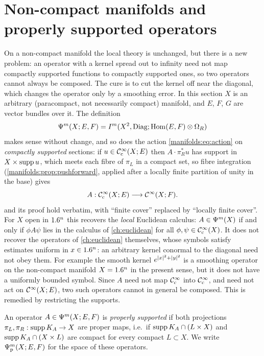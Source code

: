 \section{Non-compact manifolds and properly supported operators}\label{manifolds:sec:noncompact}
On a non-compact manifold the local theory is unchanged, but there is a new
problem: an operator with a kernel spread out to infinity need not map
compactly supported functions to compactly supported ones, so two operators
cannot always be composed. The cure is to cut the kernel off near the
diagonal, which changes the operator only by a smoothing error.
In this section $X$ is an arbitrary (paracompact, not necessarily compact)
manifold, and $E$, $F$, $G$ are vector bundles over it. The definition
\begin{equation*}
\Psi^{m}(X;E,F)=I^{m}(X^2,\operatorname{Diag};\operatorname{Hom}(E,F)\otimes\Omega_R)
\end{equation*}
makes sense without change, and so does the action
\eqref{manifolds:eq:action} on \emph{compactly supported} sections: if
$u\in\mathcal{C}^\infty_{\mathrm{c}}(X;E)$ then $A\cdot\pi_R^*u$ has support in $X\times\operatorname{supp} u$, which meets
each fibre of $\pi_L$ in a compact set, so fibre integration
(\cref{manifolds:prop:pushforward}, applied after a locally finite partition of
unity in the base) gives
\begin{equation*}
A:\mathcal{C}^\infty_{\mathrm{c}}(X;E)\longrightarrow\mathcal{C}^\infty(X;F).
\end{equation*}
 and its proof hold verbatim, with ``finite cover''
replaced by ``locally finite cover''. For $X$ open in $1.6^n$ this recovers the
\emph{local} Euclidean calculus: $A\in\Psi^{m}(X)$ if and only if $\phi A\psi$ lies in
the calculus of \cref{ch:euclidean} for all $\phi,\psi\in\mathcal{C}^\infty_{\mathrm{c}}(X)$. It does not recover the
operators of \cref{ch:euclidean} themselves, whose symbols satisfy estimates uniform
in $x\in1.6^n$: an arbitrary kernel conormal to the diagonal need not obey them. For
example the smooth kernel $e^{\lvert x\rvert^2+\lvert y\rvert^2}$ is a smoothing operator on the
non-compact manifold $X=1.6^n$ in the present sense, but it does not have a uniformly
bounded symbol.
Since $A$ need not map $\mathcal{C}^\infty_{\mathrm{c}}$ into $\mathcal{C}^\infty_{\mathrm{c}}$, and need not act on $\mathcal{C}^\infty(X;E)$, two
such operators cannot in general be composed. This is remedied by restricting
the supports.

\begin{definition}\label{manifolds:def:proper}
An operator $A\in\Psi^{m}(X;E,F)$ is \emph{properly supported} if both
projections $\pi_L,\pi_R:\operatorname{supp} K_A\to X$ are proper maps, i.e.\ if
$\operatorname{supp} K_A\cap(L\times X)$ and $\operatorname{supp} K_A\cap(X\times L)$ are compact for every
compact $L\subset X$. We write $\Psi^{m}_{\mathrm{p}}(X;E,F)$ for the space of
these operators.
\end{definition}


